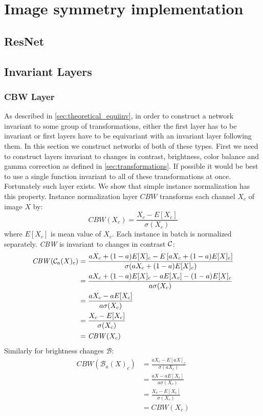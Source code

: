 \section{Image symmetry implementation}
\newcommand\cbw{\mathit{CBW}}
\newcommand\gbw{\mathit{GBW}}

\subsection{ResNet}
\subsection{Invariant Layers}
\subsubsection{CBW Layer}
As described in \ref{sec:theoretical_equiinv}, in order to construct a network
invariant to some group of transformations, either the first layer has to be
invariant or first layers have to be equivariant with an invariant layer
following them. In this section we construct networks of both of these types.
First we need to construct layers invariant to changes in
contrast, brightness, color balance and gamma correction as defined in
\ref{sec:transformations}. If possible it would be best to use a single function
invariant to all of these transformations at once. Fortunately such layer
exists. We show that simple instance normalization has this property.
Instance normalization layer $\mathit{CBW}$ transforms each channel
$X_c$ of image $X$ by:
$$ \mathit{CBW}(X_c) = \frac{X_c-E[X_c]}{\sigma(X_c)} $$
where $E[X_c]$ is mean value of $X_c$.
Each instance in batch is normalized separately.
\textit{CBW} is invariant to changes in contrast $\mathcal{C}$:
\begin{align*}
    \mathit{CBW}(\mathcal{C}_a(X)_c) &=
    \frac{aX_c+(1-a)E[X]_c - E\left[aX_c+(1-a)E[X]_c\right]}{\sigma(aX_c+(1-a)E[X]_c)} \\
    &= \frac{aX_c+(1-a)E[X]_c - aE[X_c]-(1-a)E[X]_c}{a\sigma(X_c)} \\
    &= \frac{aX_c-aE[X_c]}{a\sigma(X_c)} \\
    &= \frac{X_c-E[X_c]}{\sigma(X_c)} \\
    &= \mathit{CBW}(X_c)
\end{align*}
Similarly for brightness changes $\mathcal{B}$:
\begin{align*}
    \mathit{CBW}(\mathcal{B}_a(X)_c) &=
    \frac{aX_c - E\left[aX\right]_c}{\sigma(aX_c)} \\
    &= \frac{aX-aE[X_c]}{a\sigma(X_c)} \\
    &= \frac{X_c-E[X_c]}{\sigma(X_c)} \\
    &= \mathit{CBW}(X_c)
\end{align*}
